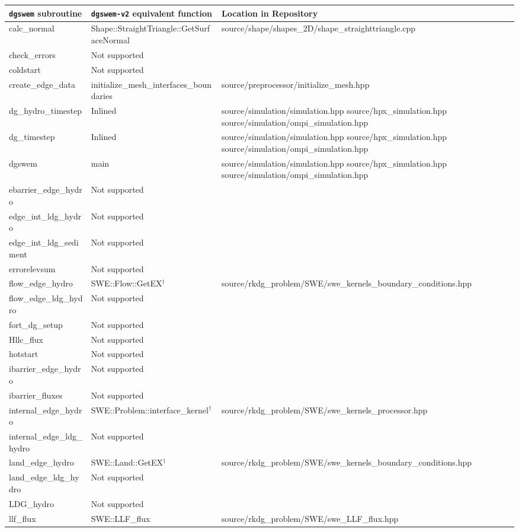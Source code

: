 { \scriptsize
\begin{longtable}{ l | p{55mm} | p{86mm} }
\hline
\hline
{\normalsize \texttt{dgswem} subroutine} & {\normalsize \texttt{dgswem-v2} equivalent function} & 
{\normalsize Location in Repository }
\tabularnewline \hline
calc\_normal	& Shape::StraightTriangle::GetSurfaceNormal	& source/shape/shapes\_2D/shape\_straighttriangle.cpp
\tabularnewline \hline
check\_errors & Not supported &
\tabularnewline \hline	
coldstart & Not supported &
\tabularnewline \hline	
create\_edge\_data & initialize\_mesh\_interfaces\_boundaries & source/preprocessor/initialize\_mesh.hpp
\tabularnewline \hline
dg\_hydro\_timestep & Inlined	& source/simulation/simulation.hpp \newline source/hpx\_simulation.hpp \newline source/simulation/ompi\_simulation.hpp
\tabularnewline \hline
dg\_timestep	& Inlined & source/simulation/simulation.hpp \newline source/hpx\_simulation.hpp \newline source/simulation/ompi\_simulation.hpp
\tabularnewline \hline
dgswem & main & source/simulation/simulation.hpp \newline source/hpx\_simulation.hpp \newline source/simulation/ompi\_simulation.hpp
\tabularnewline \hline
ebarrier\_edge\_hydro	& Not supported &	
\tabularnewline \hline
edge\_int\_ldg\_hydro & Not supported &
\tabularnewline \hline
edge\_int\_ldg\_sediment & Not supported &	
\tabularnewline \hline
errorelevsum & Not supported &
\tabularnewline \hline
flow\_edge\_hydro & SWE::Flow::GetEX$^\dagger$ & source/rkdg_problem/SWE/swe\_kernels\_boundary\_conditions.hpp
\tabularnewline \hline
flow\_edge\_ldg\_hydro	& Not supported &
\tabularnewline \hline
fort\_dg\_setup & Not supported &	
\tabularnewline \hline
Hllc\_flux & Not supported &
\tabularnewline \hline
hotstart & Not supported &	
\tabularnewline \hline
ibarrier\_edge\_hydro	& Not supported &	
\tabularnewline \hline
ibarrier\_fluxes & Not supported &
\tabularnewline \hline
internal\_edge\_hydro & SWE::Problem::interface\_kernel$^\dagger$ & source/rkdg_problem/SWE/swe\_kernels\_processor.hpp
\tabularnewline \hline
internal\_edge\_ldg\_hydro & Not supported &
\tabularnewline \hline
land\_edge\_hydro & SWE::Land::GetEX$^\dagger$ & source/rkdg_problem/SWE/swe\_kernels\_boundary\_conditions.hpp
\tabularnewline \hline
land\_edge\_ldg\_hydro & Not supported &
\tabularnewline \hline
LDG\_hydro & Not supported &
\tabularnewline \hline
llf\_flux & SWE::LLF\_flux & source/rkdg_problem/SWE/swe\_LLF\_flux.hpp

\end{longtable}}
